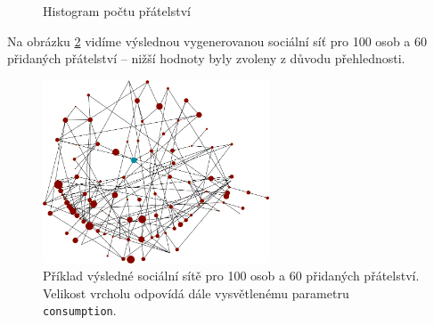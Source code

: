 \documentclass[a4wide,12pt]{report}
\begin{document}
\begin{figure}[h]
  \centering
  \caption{Histogram počtu přátelství}
  \label{fig:hist_fr}
\end{figure}
Na obrázku \ref{fig:socgen} vidíme výslednou vygenerovanou sociální síť pro 100 osob a 60 přidaných přátelství -- nižší hodnoty byly zvoleny z důvodu přehlednosti.
\begin{figure}[h]
  \centering
  \includegraphics[width=0.6\textwidth]{oriflame7_view1.png}
  \caption{Příklad výsledné sociální sítě pro 100 osob a 60 přidaných přátelství. Velikost vrcholu odpovídá dále vysvětlenému parametru \texttt{consumption}.}
  \label{fig:socgen}
\end{figure}
\end{document}
